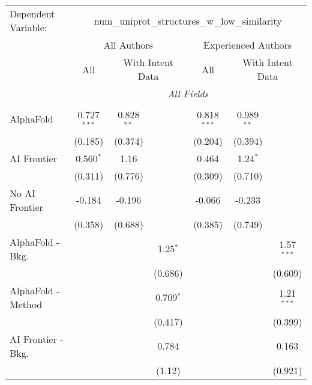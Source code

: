 \begingroup
\centering
\begin{tabular}{lcccccc}
   \tabularnewline \midrule \midrule
   Dependent Variable: & \multicolumn{6}{c}{num\_uniprot\_structures\_w\_low\_similarity}\\
 & \multicolumn{3}{c}{All Authors} & \multicolumn{3}{c}{Experienced Authors} \\
\cmidrule(lr){2-4} \cmidrule(lr){5-7}
 & \multicolumn{1}{c}{All} & \multicolumn{2}{c}{With Intent Data} & \multicolumn{1}{c}{All} & \multicolumn{2}{c}{With Intent Data} \\
\cmidrule(lr){2-2} \cmidrule(lr){3-4} \cmidrule(lr){5-5} \cmidrule(lr){6-7}
 & \multicolumn{6}{c}{\textit{All Fields}} \\ \\
   AlphaFold               & 0.727$^{***}$ & 0.828$^{**}$ &             & 0.818$^{***}$ & 0.989$^{**}$ &   \\   
                           & (0.185)       & (0.374)      &             & (0.204)       & (0.394)      &   \\   
   AI Frontier             & 0.560$^{*}$   & 1.16         &             & 0.464         & 1.24$^{*}$   &   \\   
                           & (0.311)       & (0.776)      &             & (0.309)       & (0.710)      &   \\   
   No AI Frontier          & -0.184        & -0.196       &             & -0.066        & -0.233       &   \\   
                           & (0.358)       & (0.688)      &             & (0.385)       & (0.749)      &   \\   
   AlphaFold - Bkg.        &               &              & 1.25$^{*}$  &               &              & 1.57$^{***}$\\   
                           &               &              & (0.686)     &               &              & (0.609)\\   
   AlphaFold - Method      &               &              & 0.709$^{*}$ &               &              & 1.21$^{***}$\\   
                           &               &              & (0.417)     &               &              & (0.399)\\   
   AI Frontier - Bkg.      &               &              & 0.784       &               &              & 0.163\\   
                           &               &              & (1.12)      &               &              & (0.921)\\   

\end{tabular}
